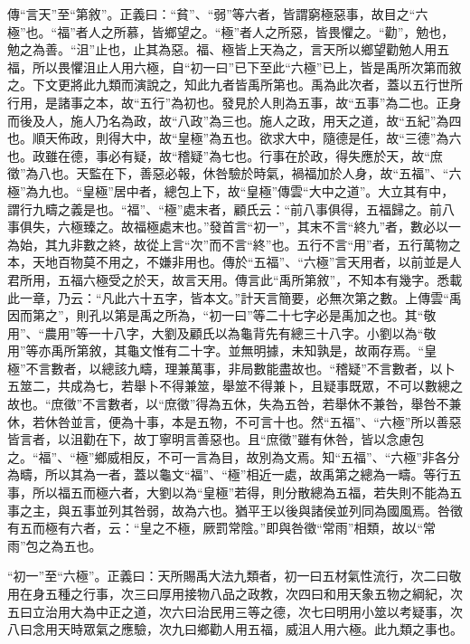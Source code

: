 {\noindent\zhuan{}\fzbyks 傳“言天”至“第敘”。正義曰：“貧”、“弱”等六者，皆謂窮極惡事，故目之“六極”也。“福”者人之所慕，皆鄉望之。“極”者人之所惡，皆畏懼之。“勸”，勉也，勉之為善。“沮”止也，止其為惡。福、極皆上天為之，言天所以鄉望勸勉人用五福，所以畏懼沮止人用六極，自“初一曰”已下至此“六極”已上，皆是禹所次第而敘之。下文更將此九類而演說之，知此九者皆禹所第也。禹為此次者，蓋以五行世所行用，是諸事之本，故“五行”為初也。發見於人則為五事，故“五事”為二也。正身而後及人，施人乃名為政，故“八政”為三也。施人之政，用天之道，故“五紀”為四也。順天佈政，則得大中，故“皇極”為五也。欲求大中，隨德是任，故“三德”為六也。政雖在德，事必有疑，故“稽疑”為七也。行事在於政，得失應於天，故“庶徵”為八也。天監在下，善惡必報，休咎驗於時氣，禍福加於人身，故“五福”、“六極”為九也。“皇極”居中者，總包上下，故“皇極”傳雲“大中之道”。大立其有中，謂行九疇之義是也。“福”、“極”處末者，顧氏云：“前八事俱得，五福歸之。前八事俱失，六極臻之。故福極處末也。”發首言“初一”，其末不言“終九”者，數必以一為始，其九非數之終，故從上言“次”而不言“終”也。五行不言“用”者，五行萬物之本，天地百物莫不用之，不嫌非用也。傳於“五福”、“六極”言天用者，以前並是人君所用，五福六極受之於天，故言天用。傳言此“禹所第敘”，不知本有幾字。悉載此一章，乃云：“凡此六十五字，皆本文。”計天言簡要，必無次第之數。上傳雲“禹因而第之”，則孔以第是禹之所為，“初一曰”等二十七字必是禹加之也。其“敬用”、“農用”等一十八字，大劉及顧氏以為龜背先有總三十八字。小劉以為“敬用”等亦禹所第敘，其龜文惟有二十字。並無明據，未知孰是，故兩存焉。“皇極”不言數者，以總該九疇，理兼萬事，非局數能盡故也。“稽疑”不言數者，以卜五筮二，共成為七，若舉卜不得兼筮，舉筮不得兼卜，且疑事既眾，不可以數總之故也。“庶徵”不言數者，以“庶徵”得為五休，失為五咎，若舉休不兼咎，舉咎不兼休，若休咎並言，便為十事，本是五物，不可言十也。然“五福”、“六極”所以善惡皆言者，以沮勸在下，故丁寧明言善惡也。且“庶徵”雖有休咎，皆以念慮包之。“福”、“極”鄉威相反，不可一言為目，故別為文焉。知“五福”、“六極”非各分為疇，所以其為一者，蓋以龜文“福”、“極”相近一處，故禹第之總為一疇。等行五事，所以福五而極六者，大劉以為“皇極”若得，則分散總為五福，若失則不能為五事之主，與五事並列其咎弱，故為六也。猶平王以後與諸侯並列同為國風焉。咎徵有五而極有六者，云：“皇之不極，厥罰常陰。”即與咎徵“常雨”相類，故以“常雨”包之為五也。 \par}

{\noindent\shu{}\fzkt “初一”至“六極”。正義曰：天所賜禹大法九類者，初一曰五材氣性流行，次二曰敬用在身五種之行事，次三曰厚用接物八品之政教，次四曰和用天象五物之綱紀，次五曰立治用大為中正之道，次六曰治民用三等之德，次七曰明用小筮以考疑事，次八曰念用天時眾氣之應驗，次九曰鄉勸人用五福，威沮人用六極。此九類之事也。 \par}

